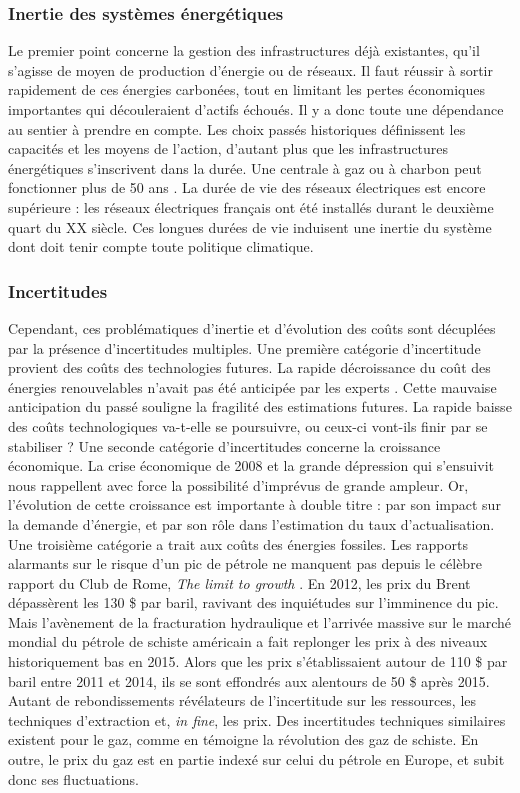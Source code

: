 \subsubsection{Inertie des systèmes énergétiques}
Le premier point concerne la gestion des infrastructures déjà existantes, qu’il s’agisse de moyen de production d’énergie ou de réseaux. Il faut réussir à sortir rapidement de ces énergies carbonées, tout en limitant les pertes économiques importantes qui découleraient d’actifs échoués. Il y a donc toute une dépendance au sentier à prendre en compte. Les choix passés historiques définissent les capacités et les moyens de l’action, d’autant plus que les infrastructures énergétiques s’inscrivent dans la durée. Une centrale à gaz ou à charbon peut fonctionner plus de 50 ans \citep{IEA2005}. La durée de vie des réseaux électriques est encore supérieure : les réseaux électriques français ont été installés durant le deuxième quart du XX siècle. Ces longues durées de vie induisent une inertie du système dont doit tenir compte toute politique climatique.

\subsubsection{Incertitudes}
Cependant, ces problématiques d’inertie et d'évolution des coûts sont décuplées par la présence d’incertitudes multiples.
Une première catégorie d’incertitude provient des coûts des technologies futures. La rapide décroissance du coût des énergies renouvelables n’avait pas été anticipée par les experts \citep{Metayer2015}. Cette mauvaise anticipation du passé souligne la fragilité des estimations futures. La rapide baisse des coûts technologiques va-t-elle se poursuivre, ou ceux-ci vont-ils finir par se stabiliser ? 
Une seconde catégorie d’incertitudes concerne la croissance économique. La crise économique de 2008 et la grande dépression qui s’ensuivit nous rappellent avec force la possibilité d'imprévus de grande ampleur. Or, l’évolution de cette croissance est importante à double titre : par son impact sur la demande d’énergie, et par son rôle dans l’estimation du taux d’actualisation. 
Une troisième catégorie a trait aux coûts des énergies fossiles. Les rapports alarmants sur le risque d’un pic de pétrole ne manquent pas depuis le célèbre rapport du Club de Rome, \textit{The limit to growth} \citep{Meadows1972}. En 2012, les prix du Brent dépassèrent les 130 \$ par baril, ravivant des inquiétudes sur l’imminence du pic. Mais l’avènement de la fracturation hydraulique et l’arrivée massive sur le marché mondial du pétrole de schiste américain a fait replonger les prix à des niveaux historiquement bas en 2015. Alors que les prix s’établissaient autour de 110 \$ par baril entre 2011 et 2014, ils se sont effondrés aux alentours de 50 \$ après 2015. Autant de rebondissements révélateurs de l’incertitude sur les ressources, les techniques d’extraction et, \textit{in fine}, les prix. 
Des incertitudes techniques similaires existent pour le gaz, comme en témoigne la révolution des gaz de schiste. En outre, le prix du gaz est en partie indexé sur celui du pétrole en Europe, et subit donc ses fluctuations. 

